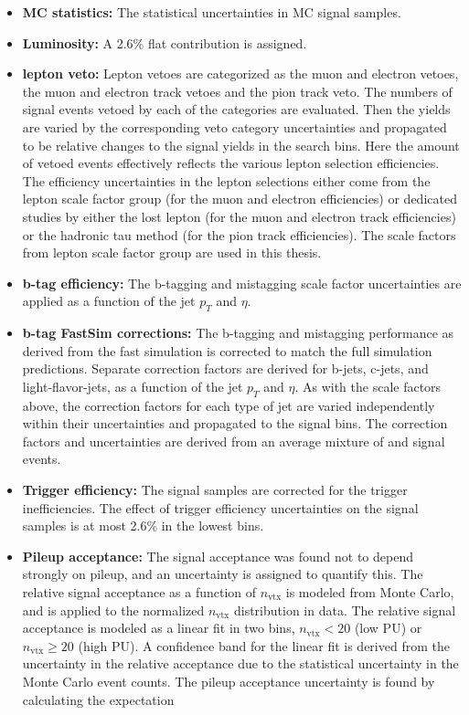 \begin{itemize}
\item {\bf MC statistics:} The statistical uncertainties in MC signal samples.
\item {\bf Luminosity:} A 2.6\% flat contribution is assigned.
\item {\bf lepton veto:} Lepton vetoes are categorized as the muon and electron vetoes, the muon and electron track vetoes and the pion track veto.
The numbers of signal events vetoed by each of the categories are evaluated. Then the yields are varied by the corresponding veto category uncertainties and propagated to be relative changes to the signal yields in the search bins. Here the amount of vetoed events effectively reflects the various lepton selection efficiencies.
The efficiency uncertainties in the lepton selections either come from the lepton scale factor group (for the muon and electron efficiencies) or dedicated studies by either the lost lepton (for the muon and electron track efficiencies) or the hadronic tau method (for the pion track efficiencies). The scale factors from lepton scale factor group are used in this thesis.
\item {\bf b-tag efficiency:} The b-tagging and mistagging scale factor uncertainties are applied as a function of the jet $p_{T}$ and $\eta$.
\item {\bf b-tag FastSim corrections:} The b-tagging and mistagging performance as derived from the fast simulation is corrected to match the
full simulation predictions. Separate correction factors are derived for b-jets, c-jets, and light-flavor-jets, as a function of the jet $p_{T}$ and $\eta$. As with the scale factors above, the correction factors for each type of jet are varied independently within their uncertainties and propagated to the signal bins. The correction factors and uncertainties are derived from an average mixture of \ttbar and signal events.
\item {\bf Trigger efficiency:} The signal samples are corrected for the trigger inefficiencies. The effect of trigger efficiency uncertainties on the signal samples is at most 2.6\% in the lowest \MET bins.
\item {\bf Pileup acceptance:}
The signal acceptance was found not to depend strongly on pileup, and an uncertainty is assigned to quantify this. The relative signal acceptance as a function of $n_{\text{vtx}}$ is modeled from Monte Carlo, and is applied to the normalized $n_{\text{vtx}}$ distribution in data.
The relative signal acceptance is modeled as a linear fit in two bins, $n_{\text{vtx}} < 20$ (low PU) or $n_{\text{vtx}} \geq 20$ (high PU). A confidence band for the linear fit is derived from the uncertainty in the relative acceptance due to the statistical uncertainty in the Monte Carlo event counts. The pileup acceptance uncertainty is found by calculating the expectation

\end{itemize}
